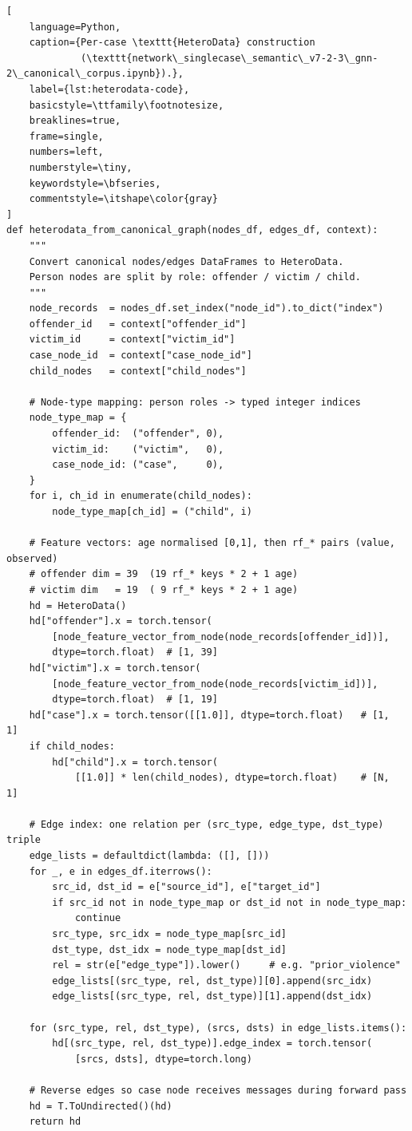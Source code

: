 \begin{lstlisting}[
    language=Python,
    caption={Per-case \texttt{HeteroData} construction
             (\texttt{network\_singlecase\_semantic\_v7-2-3\_gnn-2\_canonical\_corpus.ipynb}).},
    label={lst:heterodata-code},
    basicstyle=\ttfamily\footnotesize,
    breaklines=true,
    frame=single,
    numbers=left,
    numberstyle=\tiny,
    keywordstyle=\bfseries,
    commentstyle=\itshape\color{gray}
]
def heterodata_from_canonical_graph(nodes_df, edges_df, context):
    """
    Convert canonical nodes/edges DataFrames to HeteroData.
    Person nodes are split by role: offender / victim / child.
    """
    node_records  = nodes_df.set_index("node_id").to_dict("index")
    offender_id   = context["offender_id"]
    victim_id     = context["victim_id"]
    case_node_id  = context["case_node_id"]
    child_nodes   = context["child_nodes"]

    # Node-type mapping: person roles -> typed integer indices
    node_type_map = {
        offender_id:  ("offender", 0),
        victim_id:    ("victim",   0),
        case_node_id: ("case",     0),
    }
    for i, ch_id in enumerate(child_nodes):
        node_type_map[ch_id] = ("child", i)

    # Feature vectors: age normalised [0,1], then rf_* pairs (value, observed)
    # offender dim = 39  (19 rf_* keys * 2 + 1 age)
    # victim dim   = 19  ( 9 rf_* keys * 2 + 1 age)
    hd = HeteroData()
    hd["offender"].x = torch.tensor(
        [node_feature_vector_from_node(node_records[offender_id])],
        dtype=torch.float)  # [1, 39]
    hd["victim"].x = torch.tensor(
        [node_feature_vector_from_node(node_records[victim_id])],
        dtype=torch.float)  # [1, 19]
    hd["case"].x = torch.tensor([[1.0]], dtype=torch.float)   # [1,  1]
    if child_nodes:
        hd["child"].x = torch.tensor(
            [[1.0]] * len(child_nodes), dtype=torch.float)    # [N,  1]

    # Edge index: one relation per (src_type, edge_type, dst_type) triple
    edge_lists = defaultdict(lambda: ([], []))
    for _, e in edges_df.iterrows():
        src_id, dst_id = e["source_id"], e["target_id"]
        if src_id not in node_type_map or dst_id not in node_type_map:
            continue
        src_type, src_idx = node_type_map[src_id]
        dst_type, dst_idx = node_type_map[dst_id]
        rel = str(e["edge_type"]).lower()     # e.g. "prior_violence"
        edge_lists[(src_type, rel, dst_type)][0].append(src_idx)
        edge_lists[(src_type, rel, dst_type)][1].append(dst_idx)

    for (src_type, rel, dst_type), (srcs, dsts) in edge_lists.items():
        hd[(src_type, rel, dst_type)].edge_index = torch.tensor(
            [srcs, dsts], dtype=torch.long)

    # Reverse edges so case node receives messages during forward pass
    hd = T.ToUndirected()(hd)
    return hd
\end{lstlisting}

